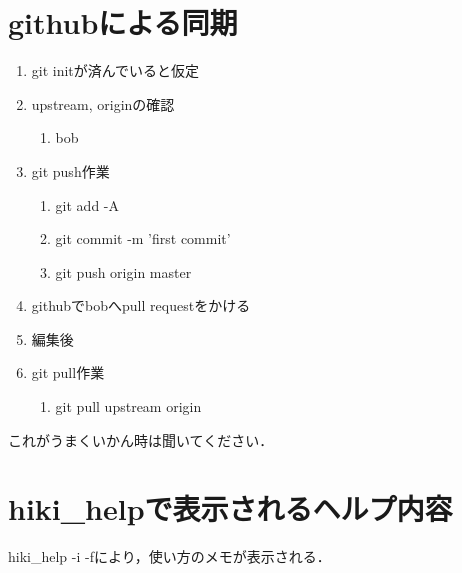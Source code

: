 \documentclass[12pt,a4paper]{jsarticle}
\begin{document}
\section{githubによる同期}\begin{enumerate}
\item git initが済んでいると仮定
\item upstream, originの確認\begin{enumerate}
\item bob%
\end{enumerate}
\item git push作業\begin{enumerate}
\item git add -A
\item git commit -m 'first commit'
\item git push origin master
\end{enumerate}
\item githubでbobへpull requestをかける
\item 編集後
\item git pull作業\begin{enumerate}
\item git pull upstream origin
\end{enumerate}
\end{enumerate}
これがうまくいかん時は聞いてください．

\section{hiki\_helpで表示されるヘルプ内容}
hiki\_help -i -fにより，使い方のメモが表示される．
\end{document}
